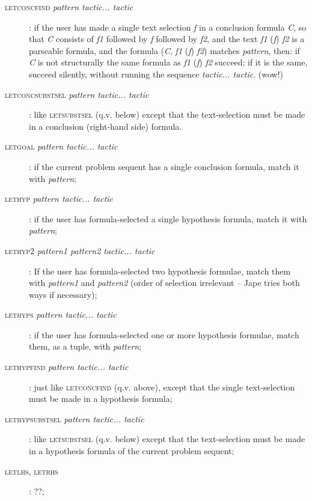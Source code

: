 \begin{description}
\begin{description}
\item [\textsc{letconcfind} \textit{pattern tactic... tactic}]: if the user has made a single text selection \textit{f} in a conclusion formula \textit{C}, so that \textit{C} consists of \textit{f1} followed by \textit{f} followed by \textit{f2}, and the text \textit{f1} (\textit{f}) \textit{f2} is a parseable formula, and the formula (\textit{C}, \textit{f1} (\textit{f}) \textit{f2}) matches \textit{pattern}, then: if \textit{C} is not structurally the same formula as \textit{f1} (\textit{f}) \textit{f2} succeed; if it is the same, succeed silently, without running the sequence \textit{tactic... tactic}. (wow!)

\item [\textsc{letconcsubstsel} \textit{pattern tactic... tactic}]: like \textsc{letsubstsel} (q.v. below) except that the text-selection must be made in a conclusion (right-hand side) formula.

\item [\textsc{letgoal} \textit{pattern tactic... tactic}]: if the current problem sequent has a single conclusion formula, match it with \textit{pattern}; 

\item [\textsc{lethyp} \textit{pattern tactic... tactic}]: if the user has formula-selected a single hypothesis formula, match it with \textit{pattern}; 
\item [\textsc{lethyp2} \textit{pattern1 pattern2 tactic... tactic}]: If the user has formula-selected two hypothesis formulae, match them with \textit{pattern1} and \textit{pattern2} (order of selection irrelevant -- Jape tries both ways if necessary); 
\item [\textsc{lethyps} \textit{pattern tactic... tactic}]: if the user has formula-selected one or more hypothesis formulae, match them, as a tuple, with \textit{pattern}; 


\item [\textsc{lethypfind} \textit{pattern tactic... tactic}]: just like \textsc{letconcfind} (q.v. above), except that the single text-selection must be made in a hypothesis formula;

\item [\textsc{lethypsubstsel} \textit{pattern tactic... tactic}]: like \textsc{letsubstsel} (q.v. below) except that the text-selection must be made in a hypothesis formula of the current problem sequent;

\item[\textsc{letlhs, letrhs}]: ??;


\end{description}
\end{description}
